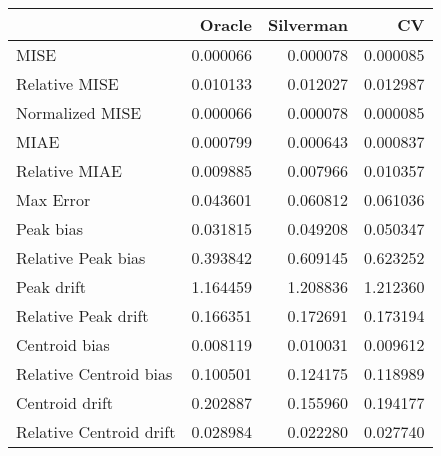 \begin{tabular}{lrrr}
  \hline
 & Oracle & Silverman & CV \\ 
  \hline
MISE & 0.000066 & 0.000078 & 0.000085 \\ 
  Relative MISE & 0.010133 & 0.012027 & 0.012987 \\ 
  Normalized MISE & 0.000066 & 0.000078 & 0.000085 \\ 
  MIAE & 0.000799 & 0.000643 & 0.000837 \\ 
  Relative MIAE & 0.009885 & 0.007966 & 0.010357 \\ 
  Max Error & 0.043601 & 0.060812 & 0.061036 \\ 
  Peak bias & 0.031815 & 0.049208 & 0.050347 \\ 
  Relative Peak bias & 0.393842 & 0.609145 & 0.623252 \\ 
  Peak drift & 1.164459 & 1.208836 & 1.212360 \\ 
  Relative Peak drift & 0.166351 & 0.172691 & 0.173194 \\ 
  Centroid bias & 0.008119 & 0.010031 & 0.009612 \\ 
  Relative Centroid bias & 0.100501 & 0.124175 & 0.118989 \\ 
  Centroid drift & 0.202887 & 0.155960 & 0.194177 \\ 
  Relative Centroid drift & 0.028984 & 0.022280 & 0.027740 \\ 
   \hline
\end{tabular}
